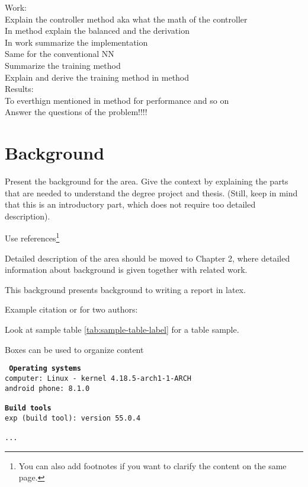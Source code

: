 Work:\\
Explain the controller method aka what the math of the controller\\
In method explain the balanced and the derivation\\
In work summarize the implementation\\
Same for the conventional NN\\
Summarize the training method\\
Explain and derive the training method in method\\


Results:\\
To everthign mentioned in method for performance and so on\\
Answer the questions of the problem!!!!\\


\section{Background}
\label{sec:background}
Present the background for the area. Give the context by explaining the parts that are needed to understand the degree project and thesis. (Still, keep in mind that this is an introductory part, which does not require too detailed description).

Use references\footnote{You can also add footnotes if you want to clarify the content on the same page.}

Detailed description of the area should be moved to Chapter 2, where detailed information about background is given together with related work.


This background presents background to writing a report in latex.


Example citation \cite{Jones2017} or for two authors: \cite{Jones2017, Liu2017}

Look at sample table \ref{tab:sample-table-label} for a table sample.



Boxes can be used to organize content

\begin{tcolorbox}[title={Development environment for prototype}]
	\tt{
		\textbf{Operating systems }\\
		computer: Linux - kernel 4.18.5-arch1-1-ARCH\\
		android phone: 8.1.0\\
		~\\
		\textbf{Build tools}\\
		exp (build tool): version 55.0.4\\
		~\\
		...
	}
\end{tcolorbox}

